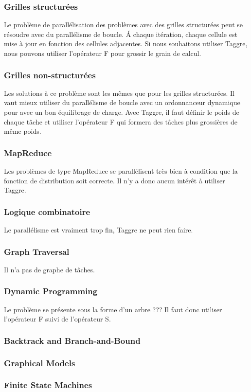 \subsubsection{Grilles structurées}
Le problème de parallélisation des problèmes avec des grilles structurées peut se résoudre avec du parallélisme de boucle.
%
\'A chaque itération, chaque cellule est mise à jour en fonction des cellules adjacentes.
%
Si nous souhaitons utiliser Taggre, nous pouvons utiliser l'opérateur F pour grossir le grain de calcul.


\subsubsection{Grilles non-structurées}
Les solutions à ce problème sont les mêmes que pour les grilles structurées.
%
Il vaut mieux utiliser du parallélisme de boucle avec un ordonnanceur dynamique pour avec un bon équilibrage de charge.
%
Avec Taggre, il faut définir le poids de chaque tâche et utiliser l'opérateur F qui formera des tâches plus grossières de même poids.


\subsubsection{MapReduce}
Les problèmes de type MapReduce se parallélisent très bien à condition que la fonction de distribution soit correcte.
%
Il n'y a donc aucun intérêt à utiliser Taggre.



\subsubsection{Logique combinatoire}
Le parallélisme est vraiment trop fin, Taggre ne peut rien faire.


\subsubsection{Graph Traversal}
Il n'a pas de graphe de tâches.


\subsubsection{Dynamic Programming}
Le problème se présente sous la forme d'un arbre ???
%
Il faut donc utiliser l'opérateur F suivi de l'opérateur S.


\subsubsection{Backtrack and Branch-and-Bound}
\subsubsection{Graphical Models}
\subsubsection{Finite State Machines}
